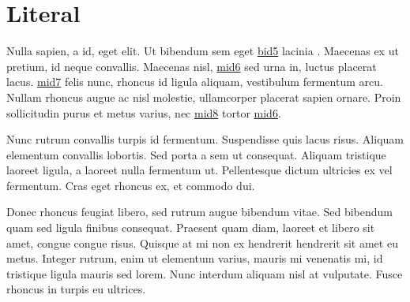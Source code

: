 \documentclass[letterpaper,10pt,english]{sphinxmanual}
\begin{document}
\section{Literal}
\label{\detokenize{test:literal}}\begin{sphinxalltt}
Nulla \hyperlink{\detokenize{id2}}{} sapien, \hyperlink{\detokenize{id5}}{} a
\hyperlink{\detokenize{id8}}{} id, \hyperlink{\detokenize{id9}}{} eget elit. \hypertarget{\detokenize{id10}}{Ut}
bibendum sem eget \hyperlink{\detokenize{bid5-ref32}}{\hypertarget{\detokenize{bid5}}{bid5}} lacinia \hyperlink{\detokenize{bid1}}{\hypertarget{\detokenize{bid1-ref28}}{}}. Maecenas
\hyperlink{\detokenize{bid2}}{\hypertarget{\detokenize{bid2-ref29}}{}} ex
ut \hyperlink{\detokenize{bid3}}{\hypertarget{\detokenize{bid3-ref30}}{}} pretium, id \hyperlink{\detokenize{bid4}}{\hypertarget{\detokenize{bid4-ref31}}{}} neque convallis. Maecenas
\hyperlink{\detokenize{bid5}}{\hypertarget{\detokenize{bid5-ref32}}{}} nisl, \hyperlink{\detokenize{test-mid6-id1}}{\hypertarget{\detokenize{test-mid6-id0}}{mid6}} sed urna in, luctus placerat
lacus. \hyperlink{\detokenize{test-mid7-id0}}{\hypertarget{\detokenize{test-mid7-id1}}{mid7}} felis nunc, rhoncus id ligula aliquam, vestibulum fermentum arcu. Nullam rhoncus augue
ac nisl molestie, ullamcorper placerat sapien ornare. Proin sollicitudin purus et metus varius, nec
\hyperlink{\detokenize{test-mid8-id1}}{\hypertarget{\detokenize{test-mid8-id0}}{mid8}} tortor \hyperlink{\detokenize{test-mid6-id0}}{\hypertarget{\detokenize{test-mid6-id1}}{mid6}}.
\end{sphinxalltt}

\sphinxAtStartPar
Nunc rutrum convallis turpis id fermentum. Suspendisse quis lacus risus. Aliquam elementum convallis
lobortis. Sed porta a sem ut consequat. Aliquam tristique laoreet ligula, a laoreet nulla fermentum
ut. Pellentesque dictum ultricies ex vel fermentum. Cras eget rhoncus ex, et commodo dui.

\sphinxAtStartPar
Donec rhoncus feugiat libero, sed rutrum augue bibendum vitae. Sed bibendum quam sed ligula finibus
consequat. Praesent quam diam, laoreet et libero sit amet, congue congue risus. Quisque at mi non ex
hendrerit hendrerit sit amet eu metus. Integer rutrum, enim ut elementum varius, mauris mi venenatis
mi, id tristique ligula mauris sed lorem. Nunc interdum aliquam nisl at vulputate. Fusce rhoncus in
turpis eu ultrices.
\end{document}
